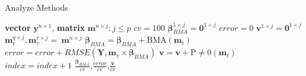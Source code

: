 \documentclass[journal=jpcbfk, manuscript=article]{achemso}
\newcommand{\+}[1]{\ensuremath{\mathbf{#1}}}
\newcommand{\rev}[1]{#1}
\begin{document}
\begin{table}[t]
\begin{minipage}[t]{0.45\linewidth}
		\centering
		\begin{algorithm}[H] 
			\footnotesize 
			\caption{\newline \rev{Analyze Methods}} \label{Method:Alg2} 
			\begin{algorithmic}[1] 
				{\scriptsize 
				\REQUIRE  \textbf{vector} $\textbf{y}^{n \times 1}$, \textbf{matrix} $\textbf{m}^{n \times j}: j \leq p$\; 
				\vspace{2.5mm} 
				\STATE $cv = 100$\; \; 
				\STATE $\boldsymbol{{\beta}}_{BMA}^{1 \times j} = \textbf{0}^{1 \times j}$ \; 
				\STATE $error = 0$ \; 
				\STATE $\textbf{v}^{1 \times j} = \textbf{0}^{1 \times j}$ \;  
				\; 
					\STATE $\textbf{m}_{t}^{q \times j}, \textbf{m}_{v}^{r \times j} =\ \textbf{m}^{n \times j}$\;
					\; 
					\STATE $\boldsymbol{\beta}_{BMA} = \boldsymbol{\beta}_{BMA} + $BMA$(\textbf{m}_{t})$ \; 
					\STATE $error = error + RMSE(\textbf{Y}, \textbf{m}_{v} \times \boldsymbol{\beta}_{BMA})$\; 
					\STATE $\textbf{v} = \textbf{v} + $P$\neq$0$(\textbf{m}_{t})$ \; 
					\STATE $index = index + 1$ 
				\ENDWHILE\; 
				\RETURN $\frac{\boldsymbol{\beta}_{BMA}}{cv}$,$\frac{error}{cv}$,$\frac{\textbf{v}}{cv}$\; } 
			\end{algorithmic}
		\end{algorithm} 
	\end{minipage}
\end{table}
\end{document}
